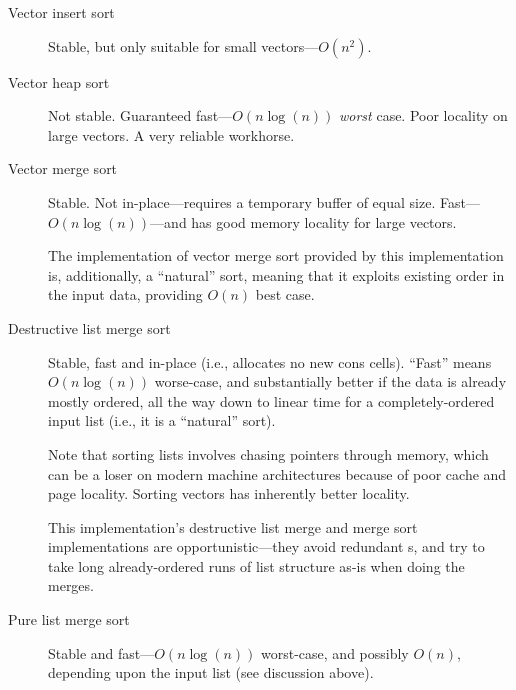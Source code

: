 \begin{description}
\item[Vector insert sort]
  Stable, but only suitable for small vectors---$O(n^2)$.
\item[Vector heap sort]
  Not stable. Guaranteed fast---$O(n\log(n))$ \emph{worst} case. Poor
  locality on large vectors. A very reliable workhorse.
\item[Vector merge sort]
    Stable. Not in-place---requires a temporary buffer of equal size. 
    Fast---$O(n\log(n))$---and has good memory locality for large vectors.
    
    The implementation of vector merge sort provided by this
    implementation is, additionally, a ``natural'' sort, meaning that it
    exploits existing order in the input data, providing $O(n)$ best case.
\item[Destructive list merge sort]
    Stable, fast and in-place (i.e., allocates no new cons cells). ``Fast''
    means $O(n\log(n))$ worse-case, and substantially better if the data
    is already mostly ordered, all the way down to linear time for
    a completely-ordered input list (i.e., it is a ``natural'' sort).

    Note that sorting lists involves chasing pointers through memory, which
    can be a loser on modern machine architectures because of poor cache and
    page locality.
    Sorting vectors has inherently better locality.
    
    This implementation's destructive list merge and merge sort
    implementations are opportunistic---they avoid redundant
    s, and try to take long
    already-ordered runs of list structure as-is when doing the merges.
\item[Pure list merge sort]
  Stable and fast---$O(n\log(n))$ worst-case, and possibly $O(n)$,
  depending upon the input list (see discussion above).
\end{description}

